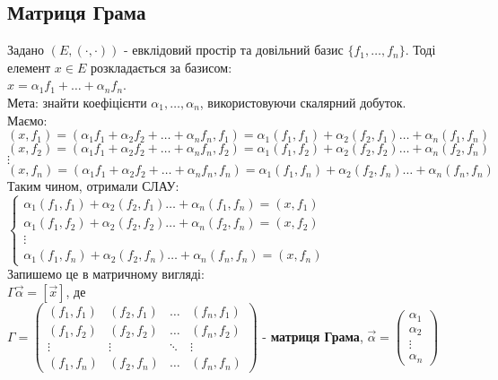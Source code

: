 \documentclass[a4paper, 10pt]{article}
\theoremstyle{theoremdd}
\theoremstyle{theoremdd}
\theoremstyle{theoremdd}
\theoremstyle{theoremdd}
\theoremstyle{theoremdd}
\theoremstyle{theoremdd}
\theoremstyle{theoremdd}
\theoremstyle{theoremdd}
\begin{document}
\subsection{Матриця Грама}
Задано $(E,(\cdot,\cdot))$ - евклідовий простір та довільний базис $\{f_1,\dots,f_n\}$. Тоді елемент $x \in E$ розкладається за базисом:\\
$x = \alpha_1 f_1 + \dots + \alpha_n f_n$.\\
Мета: знайти коефіцієнти $\alpha_1,\dots,\alpha_n$, використовуючи скалярний добуток.\\
Маємо:\\
$(x,f_1) = (\alpha_1 f_1 + \alpha_2 f_2 + \dots + \alpha_n f_n, f_1) = \alpha_1 (f_1,f_1) + \alpha_2 (f_2,f_1) \dots + \alpha_n (f_1,f_n)$\\
$(x,f_2) = (\alpha_1 f_1 + \alpha_2 f_2 + \dots + \alpha_n f_n, f_2) = \alpha_1 (f_1,f_2) + \alpha_2 (f_2,f_2) \dots + \alpha_n (f_2,f_n)$\\
$\vdots$\\
$(x,f_n) = (\alpha_1 f_1 + \alpha_2 f_2 + \dots + \alpha_n f_n, f_n) = \alpha_1 (f_1,f_n) + \alpha_2 (f_2,f_n) \dots + \alpha_n (f_n,f_n)$\\
Таким чином, отримали СЛАУ:\\
$\begin{cases}
\alpha_1 (f_1,f_1) + \alpha_2 (f_2,f_1) \dots + \alpha_n (f_1,f_n) = (x,f_1) \\
\alpha_1 (f_1,f_2) + \alpha_2 (f_2,f_2) \dots + \alpha_n (f_2,f_n) = (x,f_2) \\
\vdots \\
\alpha_1 (f_1,f_n) + \alpha_2 (f_2,f_n) \dots + \alpha_n (f_n,f_n) = (x,f_n)
\end{cases}$\\
Запишемо це в матричному вигляді:\\
$\Gamma \vec{\alpha} = [\vec{x}]$, де\\
$\Gamma = \begin{pmatrix}
(f_1,f_1) & (f_2,f_1) & \dots & (f_n,f_1) \\
(f_1,f_2) & (f_2,f_2) & \dots & (f_n,f_2) \\
\vdots & \vdots & \ddots & \vdots \\
(f_1,f_n) & (f_2,f_n) & \dots & (f_n,f_n)
\end{pmatrix}$ - \textbf{матриця Грама}, \hspace{0.5cm}
$\vec{\alpha} = \begin{pmatrix}
\alpha_1 \\ \alpha_2 \\ \vdots \\ \alpha_n
\end{pmatrix}$ \hspace{1cm}
\end{document}
